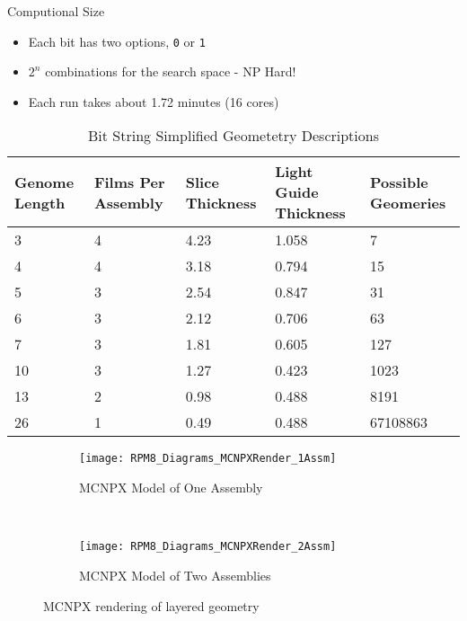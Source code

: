 \begin{frame}[fragile]{Computional Size}
\small
\begin{itemize}
  \item Each bit has two options, \verb+0+ or \verb+1+
  \item $2^n$ combinations for the search space - NP Hard!
  \item Each run takes about 1.72 minutes (16 cores)
\end{itemize}
\begin{table}
    \caption[Genome Bit String Geometries]{Bit String Simplified Geometetry Descriptions}
    \label{tab:BitStringGeo}
    \centering
    \tiny
    \begin{tabular}{ p{1.5cm} | p{1.5cm} p{1.5cm} p{1.5cm}  p{1.5cm}}
      Genome Length&Films Per Assembly&Slice Thickness&Light Guide Thickness&Possible Geomeries \\
      \hline
      \hline
      3&4&4.23&1.058&7 \\
      4&4&3.18&0.794&15 \\
      5&3&2.54&0.847&31 \\
      6&3&2.12&0.706&63 \\
      7&3&1.81&0.605&127 \\ 
      \hline
      10&3&1.27&0.423&1023 \\
      \hline
      13&2&0.98&0.488&8191 \\
      26&1&0.49&0.488&67108863 \\
    \end{tabular}
\end{table}
\end{frame}
\begin{frame}
\begin{figure}
    \centering
    \begin{subfigure}[b]{0.45\textwidth}
        \texttt{[image: RPM8\_Diagrams\_MCNPXRender\_1Assm]}
        \caption{MCNPX Model of One Assembly}
    \end{subfigure}%
    ~
    \begin{subfigure}[b]{0.45\textwidth}
        \texttt{[image: RPM8\_Diagrams\_MCNPXRender\_2Assm]}
        \caption{MCNPX Model of Two Assemblies}
    \end{subfigure}
    \caption{MCNPX rendering of layered geometry}
    \label{fig:MCNPXRendering}
\end{figure}
\end{frame}
